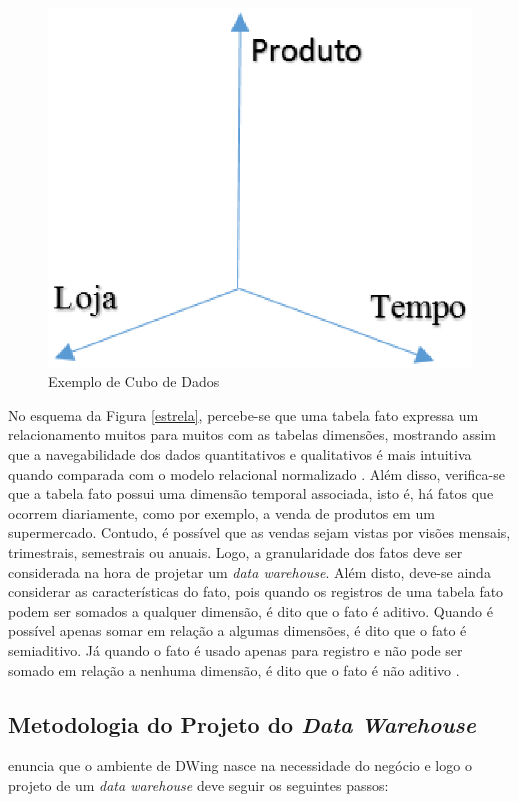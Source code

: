 \begin{figure}[h!]
\centering
\includegraphics[keepaspectratio=false,scale=0.85]{figuras/cube.eps}
\caption{Exemplo de Cubo de Dados}
\label{cube}
\end{figure}
\FloatBarrier


No esquema da Figura \ref{estrela}, percebe-se que uma tabela fato expressa um relacionamento muitos para muitos com as tabelas dimensões, mostrando assim que a navegabilidade dos dados quantitativos e qualitativos é mais intuitiva quando comparada com o modelo relacional normalizado \cite{Kimball2002}. Além disso, verifica-se que a tabela fato possui uma dimensão temporal associada, isto é, há fatos que ocorrem diariamente, como por exemplo, a venda de produtos em um supermercado. Contudo, é possível que as vendas sejam vistas por visões mensais, trimestrais, semestrais ou anuais. Logo, a granularidade dos fatos deve ser considerada na hora de projetar um \textit{data warehouse}. Além disto, deve-se ainda considerar as características do fato, pois quando os registros de uma tabela fato podem ser somados a qualquer dimensão, é dito que o fato é aditivo. Quando é possível apenas somar em relação a algumas dimensões, é dito que o fato é semiaditivo. Já quando o fato é usado apenas para registro e não pode ser somado em relação a nenhuma dimensão, é dito que o fato é não aditivo \cite{Inmon1992}.

\subsection{Metodologia do Projeto do \textit{Data Warehouse}}
\label{metodologia-dw}
 enuncia que o ambiente de DWing nasce na necessidade do negócio e logo o projeto de um \textit{data warehouse} deve seguir os seguintes passos: 


